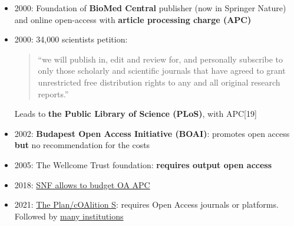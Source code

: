 \documentclass[10pt,compress,serif]{beamer}
\begin{document}
 \begin{frame}[t]%
 \vskip1cm%
\begin{itemize}

\item 2000: Foundation of \textbf{BioMed Central} publisher (now in Springer Nature) and online open-access with \textbf{article processing charge (APC)}
\item 2000: 34,000 scientists petition:
  \begin{quote}
    “we will publish in, edit and review for, and personally subscribe to only those scholarly and scientific journals that have agreed to grant unrestricted free distribution rights to any and all original research reports.”
  \end{quote}
  Leads to \textbf{the Public Library of Science (PLoS)}, with APC[19]

  \item 2002: \textbf{Budapest Open Access Initiative (BOAI)}: promotes open access \textbf{but} no recommendation for the costs
  \item 2005: The Wellcome Trust foundation: \textbf{requires output open access}
  \item 2018: \href{https://www.snf.ch/en/bQ17hb9mM1NC4awy/news/news-181010-make-open-access-the-new-normal}{SNF allows to budget OA APC}
  \item 2021: \href{https://www.coalition-s.org/}{The Plan/cOAlition S}: requires Open Access journals or platforms. Followed by \href{https://www.coalition-s.org/supporters/}{many institutions}
 \end{itemize}
\end{frame}
\end{document}
